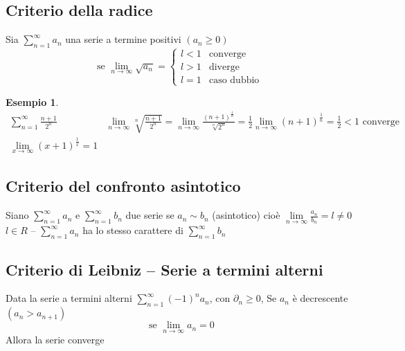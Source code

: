 \documentclass{book}
\newtheorem{esempio}{Esempio}
\begin{document}
\subsection{Criterio della radice}
Sia $\sum_{n=1}^\infty a_n$ una serie a termine positivi $(a_n\geq 0)$
\begin{equation*}
  \text{se }\lim_{n\to \infty} \sqrt{a_n}=\begin{cases}
                                            l<1 & \text{converge}\\
                                            l>1 & \text{diverge}\\
                                            l=1 & \text{caso dubbio}
                                          \end{cases}
\end{equation*}
\begin{esempio}
	\begin{eqnarray*}
		\displaystyle\sum_{n=1}^{\infty}\frac{n+1}{2^n} & \lim\limits_{n\to
		\infty}
		\sqrt[n]{\frac{n+1}{2^n}}=\lim\limits_{n\to\infty}
		\frac{(n+1)^{\frac{1}{n}}}{\sqrt[n]{2^n}}=\frac{1}{2}\lim_{n\to \infty}
		(n+1)^\frac{1}{n}=\frac{1}{2}<1 \text{ converge}\\
		\lim\limits_{x\to \infty} (x+1)^\frac{1}{x}=1
	\end{eqnarray*}
\end{esempio}
\subsection{Criterio del confronto asintotico}
Siano $\displaystyle\sum_{n=1}^\infty a_n$ e $\displaystyle\sum_{n=1}^\infty b_n$ due serie se $a_n\sim
b_n$ (asintotico) cioè $\lim\limits_{n\to \infty}\frac{a_n}{b_n}=l\neq 0$ $l\in
R$ -- $\displaystyle\sum_{n=1}^{\infty}a_n$ ha lo stesso carattere di $\displaystyle\sum_{n=1}^\infty b_n$
\subsection{Criterio di Leibniz -- Serie a termini alterni\label{leibniz}}
Data la serie a termini alterni $\displaystyle\sum_{n=1}^\infty(-1)^na_n$, con 
$\partial_n\geq 0$, Se $a_n$ è decrescente $(a_n> a_{n+1})$
\begin{equation*}
	\text{ se }\lim_{n\to\infty} a_n=0
\end{equation*}
Allora la serie converge 
\printindex
\end{document}
